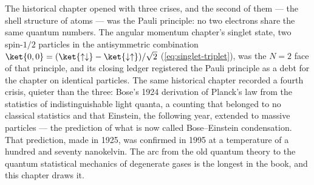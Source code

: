 The historical chapter opened with three crises, and the second of them --- the shell structure of atoms --- was the Pauli principle: no two electrons share the same quantum numbers. The angular momentum chapter's singlet state, two spin-$1/2$ particles in the antisymmetric combination $\ket{0,0} = (\ket{\uparrow\downarrow} - \ket{\downarrow\uparrow})/\sqrt{2}$ (\eqref{eq:singlet-triplet}), was the $N=2$ face of that principle, and its closing ledger registered the Pauli principle as a debt for the chapter on identical particles. The same historical chapter recorded a fourth crisis, quieter than the three: Bose's 1924 derivation of Planck's law from the statistics of indistinguishable light quanta, a counting that belonged to no classical statistics and that Einstein, the following year, extended to massive particles --- the prediction of what is now called Bose--Einstein condensation. That prediction, made in 1925, was confirmed in 1995 at a temperature of a hundred and seventy nanokelvin. The arc from the old quantum theory to the quantum statistical mechanics of degenerate gases is the longest in the book, and this chapter draws it.

